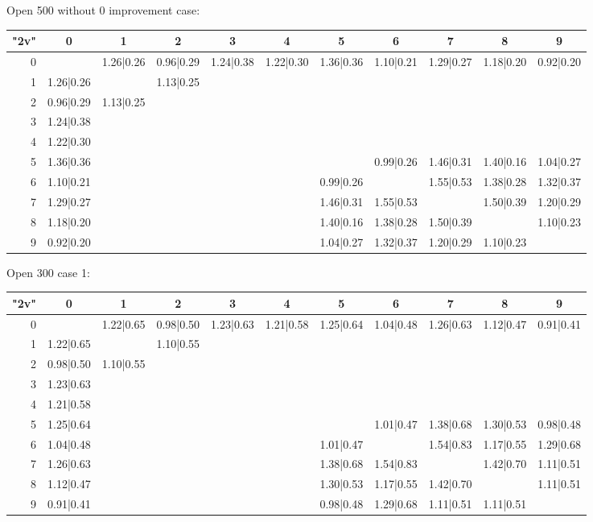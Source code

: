 \begin{table}
		\vspace{0.6cm}
	
		Open 500 without 0 improvement case:
	
	\vspace{0.6cm}
	
	
	\begin{tabular}{|r||c|c|c|c|c|c|c|c|c|c|}\hline
		{\bf "2v"} & 0 & 1 & 2 & 3 & 4 & 5 & 6 & 7 & 8 & 9 \\\hline\hline
0 & &1.26|0.26 &0.96|0.29 &1.24|0.38 &1.22|0.30 &1.36|0.36 &1.10|0.21 &1.29|0.27 &1.18|0.20 &0.92|0.20  \\\hline
1 &1.26|0.26 & &1.13|0.25 & & & & & & &  \\\hline
2 &0.96|0.29 &1.13|0.25 & & & & & & & &  \\\hline
3 &1.24|0.38 & & & & & & & & &  \\\hline
4 &1.22|0.30 & & & & & & & & &  \\\hline
5 &1.36|0.36 & & & & & &0.99|0.26 &1.46|0.31 &1.40|0.16 &1.04|0.27  \\\hline
6 &1.10|0.21 & & & & &0.99|0.26 & &1.55|0.53 &1.38|0.28 &1.32|0.37  \\\hline
7 &1.29|0.27 & & & & &1.46|0.31 &1.55|0.53 & &1.50|0.39 &1.20|0.29  \\\hline
8 &1.18|0.20 & & & & &1.40|0.16 &1.38|0.28 &1.50|0.39 & &1.10|0.23  \\\hline
9 &0.92|0.20 & & & & &1.04|0.27 &1.32|0.37 &1.20|0.29 &1.10|0.23 &  \\\hline
	\end{tabular}
	
	\vspace{0.6cm}
	
	Open 300 case 1:
	
	\vspace{0.6cm}
	
	\begin{tabular}{|r||c|c|c|c|c|c|c|c|c|c|}\hline
		{\bf "2v"} & 0 & 1 & 2 & 3 & 4 & 5 & 6 & 7 & 8 & 9 \\\hline\hline
	0 & &1.22|0.65 &0.98|0.50 &1.23|0.63 &1.21|0.58 &1.25|0.64 &1.04|0.48 &1.26|0.63 &1.12|0.47 &0.91|0.41  \\\hline
	1 &1.22|0.65 & &1.10|0.55 & & & & & & &  \\\hline
	2 &0.98|0.50 &1.10|0.55 & & & & & & & &  \\\hline
	3 &1.23|0.63 & & & & & & & & &  \\\hline
	4 &1.21|0.58 & & & & & & & & &  \\\hline
	5 &1.25|0.64 & & & & & &1.01|0.47 &1.38|0.68 &1.30|0.53 &0.98|0.48  \\\hline
	6 &1.04|0.48 & & & & &1.01|0.47 & &1.54|0.83 &1.17|0.55 &1.29|0.68  \\\hline
	7 &1.26|0.63 & & & & &1.38|0.68 &1.54|0.83 & &1.42|0.70 &1.11|0.51  \\\hline
	8 &1.12|0.47 & & & & &1.30|0.53 &1.17|0.55 &1.42|0.70 & &1.11|0.51  \\\hline
	9 &0.91|0.41 & & & & &0.98|0.48 &1.29|0.68 &1.11|0.51 &1.11|0.51 &  \\\hline
	\end{tabular}
	

\end{table}
